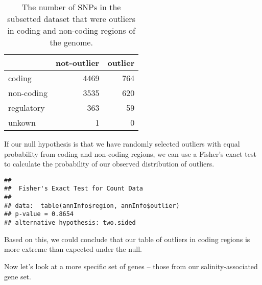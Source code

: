 \documentclass[11pt,]{article}
\newenvironment{Shaded}{\begin{snugshade}}{\end{snugshade}}
\newcommand{\KeywordTok}[1]{\textcolor[rgb]{0.13,0.29,0.53}{\textbf{#1}}}
\newcommand{\OperatorTok}[1]{\textcolor[rgb]{0.81,0.36,0.00}{\textbf{#1}}}
\newcommand{\NormalTok}[1]{#1}
\begin{document}
\begin{table}

\caption{\label{tab:summarizeAnnotations}The number of SNPs in the subsetted dataset that were outliers in coding and non-coding regions of the genome.}
\centering
\begin{tabular}[t]{lrr}
\toprule
  & not-outlier & outlier\\
\midrule
coding & 4469 & 764\\
non-coding & 3535 & 620\\
regulatory & 363 & 59\\
unkown & 1 & 0\\
\bottomrule
\end{tabular}
\end{table}

If our null hypothesis is that we have randomly selected outliers with
equal probability from coding and non-coding regions, we can use a
Fisher's exact test to calculate the probability of our observed
distribution of outliers.

\begin{Shaded}
\end{Shaded}

\begin{verbatim}
## 
##  Fisher's Exact Test for Count Data
## 
## data:  table(annInfo$region, annInfo$outlier)
## p-value = 0.8654
## alternative hypothesis: two.sided
\end{verbatim}

Based on this, we could conclude that our table of outliers in coding
regions is more extreme than expected under the null.

Now let's look at a more specific set of genes -- those from our
salinity-associated gene set.
\end{document}
